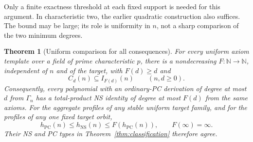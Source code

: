 \documentclass[11pt,a4paper]{article}
\newtheorem{theorem}{Theorem}[section]
\theoremstyle{definition}\newtheorem{definition}[theorem]{Definition}
\theoremstyle{remark}\newtheorem{remark}[theorem]{Remark}
\newcommand{\NS}{\mathrm{NS}}\newcommand{\PC}{\mathrm{PC}}
\newcommand{\NN}{\mathbb N}\newcommand{\N}{\mathbb N}\newcommand{\Z}{\mathbb Z}\newcommand{\Q}{\mathbb Q}\newcommand{\Fp}{\mathbb F_p}
\begin{document}
Only a finite exactness threshold at each fixed support is needed for
this argument. In characteristic two, the earlier quadratic construction also suffices. The
bound may be large; its role is uniformity in $n$, not a sharp comparison
of the two minimum degrees.

\begin{theorem}[Uniform comparison for all consequences]\label{thm:comparison}
For every uniform axiom template over a field of prime characteristic
$p$, there is a nondecreasing $F:\NN\to\NN$, independent of $n$ and of
the target, with $F(d)\ge d$ and
\begin{equation}\label{eq:whole-comparison}
                              C_d(n)\subseteq I_{F(d)}(n)
                       \qquad(n,d\ge0).
\end{equation}
Consequently, every polynomial with an ordinary-PC derivation of degree
at most $d$ from $\Gamma_n$ has a total-product NS identity of degree at
most $F(d)$ from the same axioms. For the aggregate profiles of any
stable uniform target family, and for the profiles of any one fixed
target orbit,
\begin{equation}\label{eq:target-comparison}
                      h_{\PC}(n)\le h_{\NS}(n)\le F(h_{\PC}(n)),
                      \qquad F(\infty)=\infty.
\end{equation}
Their NS and PC types in Theorem~\ref{thm:classification} therefore agree.
\end{theorem}
\end{document}
